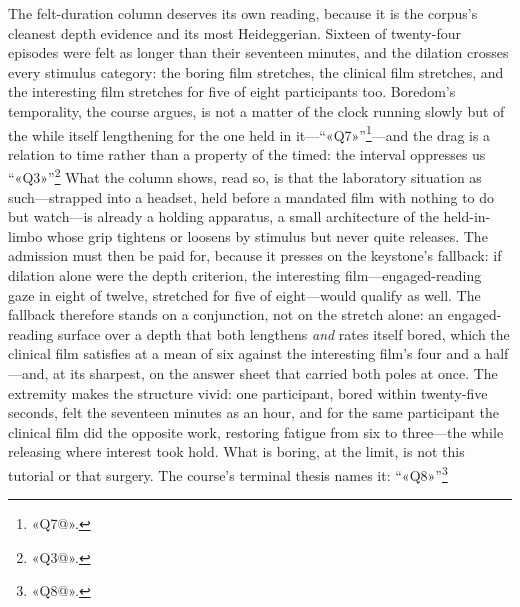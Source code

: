The felt-duration column deserves its own reading, because it is the corpus's cleanest depth evidence and its most Heideggerian. Sixteen of twenty-four episodes were felt as longer than their seventeen minutes, and the dilation crosses every stimulus category: the boring film stretches, the clinical film stretches, and the interesting film stretches for five of eight participants too. Boredom's temporality, the course argues, is not a matter of the clock running slowly but of the while itself lengthening for the one held in it---``«Q7»''\footnote{«Q7@».}---and the drag is a relation to time rather than a property of the timed: the interval oppresses us ``«Q3»''\footnote{«Q3@».} What the column shows, read so, is that the laboratory situation as such---strapped into a headset, held before a mandated film with nothing to do but watch---is already a holding apparatus, a small architecture of the held-in-limbo whose grip tightens or loosens by stimulus but never quite releases. The admission must then be paid for, because it presses on the keystone's fallback: if dilation alone were the depth criterion, the interesting film---engaged-reading gaze in eight of twelve, stretched for five of eight---would qualify as well. The fallback therefore stands on a conjunction, not on the stretch alone: an engaged-reading surface over a depth that both lengthens \textit{and} rates itself bored, which the clinical film satisfies at a mean of six against the interesting film's four and a half---and, at its sharpest, on the answer sheet that carried both poles at once. The extremity makes the structure vivid: one participant, bored within twenty-five seconds, felt the seventeen minutes as an hour, and for the same participant the clinical film did the opposite work, restoring fatigue from six to three---the while releasing where interest took hold. What is boring, at the limit, is not this tutorial or that surgery. The course's terminal thesis names it: ``«Q8»''\footnote{«Q8@».}

